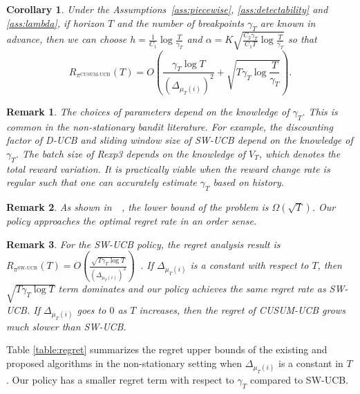 \documentclass[letterpaper]{article} %
\newtheorem{corollary}{Corollary}
\newtheorem{remark}{Remark}
\newcommand{\green}{}
\begin{document}
\begin{corollary}\label{cor:regret}
Under the Assumptions~\ref{ass:piecewise}, \ref{ass:detectability} and \ref{ass:lambda},
if horizon $T$ and the number of breakpoints $\gamma_T$ are known in advance, then we can choose $h=\frac{1}{C_1}\log \frac{T}{\gamma_T}$ and $\alpha=K\sqrt{\frac{C_2\gamma_T}{C_1T}\log\frac{T}{\gamma_T}}$ so that
\begin{equation}
R_{\pi^{\text{CUSUM-UCB}}}(T)=O\left(\frac{\gamma_T\log T}{(\Delta_{\mu_T(i)})^2}+\sqrt{T\gamma_T\log\frac{T}{\gamma_T}}\right).
\end{equation}
\end{corollary}
{\green
\begin{remark}
The choices of parameters depend on the knowledge of $\gamma_T$. This is common in the non-stationary bandit literature. For example, the discounting factor of D-UCB and sliding window size of SW-UCB depend on the knowledge of $\gamma_T$. The batch size of Rexp3 depends on the knowledge of $V_T$, which denotes the total reward variation. It is practically viable when the reward change rate is regular such that one can accurately estimate $\gamma_T$ based on history.
\end{remark}
}
\begin{remark}
As shown in~\citeauthor{garivier2008upper}~, the lower bound of the problem
is $\Omega(\sqrt{T})$. Our policy approaches the optimal regret rate
in an order sense.
\end{remark}
\begin{remark}\label{rmk:delta}
For the SW-UCB policy, the regret analysis result is $R_{\pi^{\text{SW-UCB}}}(T)=O\left(\frac{\sqrt{T\gamma_T\log T}}{(\Delta_{\mu_T(i)})^2}\right)$~\cite{garivier2008upper}. If $\Delta_{\mu_T(i)}$ is a constant with respect to $T$, then $\sqrt{T\gamma_T\log T}$ term dominates and our policy achieves the same regret rate as SW-UCB. If $\Delta_{\mu_T(i)}$ goes to $0$ as $T$ increases, then the regret of CUSUM-UCB grows much slower than SW-UCB.
\end{remark}

Table \ref{table:regret} summarizes the regret upper bounds
of the existing and proposed algorithms in the non-stationary setting
when $\Delta_{\mu_T(i)}$ is a constant in $T$. Our policy has a smaller regret term with respect to $\gamma_T$ compared to SW-UCB. 
\end{document}

